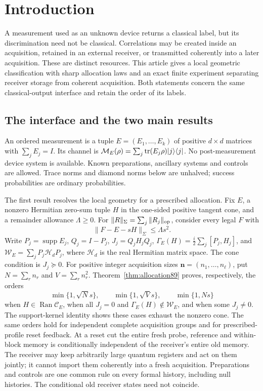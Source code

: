 \section{Introduction}\label{sec:introduction84}
A measurement used as an unknown device returns a classical label, but
its discrimination need not be classical.  Correlations may be created
inside an acquisition, retained in an external receiver, or transmitted
coherently into a later acquisition.  These are distinct resources.
This article gives a local geometric classification with sharp allocation
laws and an exact finite experiment separating receiver storage from
coherent acquisition.  Both statements concern the same classical-output
interface and retain the order of its labels.

\subsection{The interface and the two main results}
An ordered measurement is a tuple $E=(E_1,\ldots,E_k)$ of positive
$d\times d$ matrices with $\sum_jE_j=I$.  Its channel is
$\mathcal M_E(\rho)=\sum_j\operatorname{tr}(E_j\rho)|j\rangle\langle j|$.
No post-measurement device system is available.  Known preparations,
ancillary systems and controls are allowed.  Trace norms and diamond
norms below are unhalved; success probabilities are ordinary probabilities.

The first result resolves the local geometry for a prescribed allocation.
Fix $E$, a nonzero Hermitian zero-sum tuple $H$ in the one-sided positive
tangent cone, and a remainder allowance $\Lambda\ge0$.  For
$\|R\|_\Sigma=\sum_j\|R_j\|_{\rm op}$, consider every legal $F$ with
\begin{equation}\label{eq:fronttube87}
 \|F-E-sH\|_\Sigma\le\Lambda s^2.
\end{equation}
Write $P_j=\operatorname{supp}E_j$, $Q_j=I-P_j$,
$J_j=Q_jH_jQ_j$, $\Gamma_E(H)=\frac i2\sum_j[P_j,H_j]$, and
$\mathcal W_E=\sum_jP_j\mathcal H_dP_j$, where $\mathcal H_d$ is the
real Hermitian matrix space.  The cone condition is $J_j\succeq0$.
For positive integer acquisition sizes $\boldsymbol n=(n_1,\ldots,n_\ell)$,
put $N=\sum_rn_r$ and $V=\sum_rn_r^2$.
Theorem~\ref{thm:allocation89} proves, respectively, the orders
\begin{equation}\label{eq:frontprofile89}
 \min\{1,\sqrt N s\},\qquad \min\{1,\sqrt V s\},\qquad \min\{1,Ns\}
\end{equation}
when $H\in\operatorname{Ran}\mathcal C_E$, when all $J_j=0$ and
$\Gamma_E(H)\notin\mathcal W_E$, and when some $J_j\ne0$.
The support-kernel identity shows these cases exhaust the nonzero cone.
The same orders hold for independent complete acquisition groups and
for prescribed-profile reset feedback.  At a reset cut the entire fresh
probe, reference and within-block memory is conditionally independent
of the receiver's entire old memory.  The receiver may keep arbitrarily
large quantum registers and act on them jointly; it cannot import them
coherently into a fresh acquisition.  Preparations and controls are one
common rule on every formal history, including null histories.  The
conditional old receiver states need not coincide.

